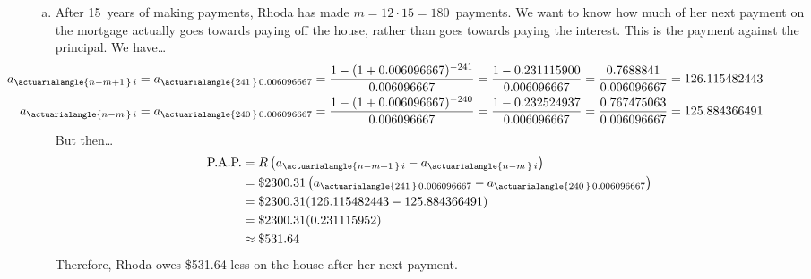 \documentclass[12pt,letterpaper]{exam}
\begin{document}
\begin{questions}
{\begin{enumerate}[(a)]
\item After 15~years of making payments, Rhoda has made $m= 12 \cdot 15= 180$~payments. We want to know how much of her next payment on the mortgage actually goes towards paying off the house, rather than goes towards paying the interest. This is the payment against the principal. We have\dots
	\[
	\begin{aligned}
	\hspace{-2.5cm} a_{\actuarialangle{n - m + 1\,}\, i}&= a_{\actuarialangle{241\,}\, 0.006096667}= \dfrac{1 - (1 + 0.006096667)^{-241}}{0.006096667}= \dfrac{1 - 0.231115900}{0.006096667}= \dfrac{0.7688841}{0.006096667}= 126.115482443 \\
	\hspace{-2.5cm} a_{\actuarialangle{n - m\,}\, i}&= a_{\actuarialangle{240\,}\, 0.006096667}= \dfrac{1 - (1 + 0.006096667)^{-240}}{0.006096667}= \dfrac{1 - 0.232524937}{0.006096667}= \dfrac{0.767475063}{0.006096667}= 125.884366491
	\end{aligned}
	\]
But then\dots
	\[
	\begin{aligned}
	\text{P.A.P.}&= R \left( a_{\actuarialangle{n-m+1\,}\, i} - a_{\actuarialangle{n-m\,}\, i} \right) \\
	&= \$2300.31 \left( a_{\actuarialangle{241\,}\, 0.006096667} - a_{\actuarialangle{240\,}\, 0.006096667} \right) \\
	&= \$2300.31 (126.115482443 - 125.884366491) \\
	&= \$2300.31(0.231115952) \\
	&\approx \$531.64
	\end{aligned}
	\]
Therefore, Rhoda owes \$531.64 less on the house after her next payment. 
\end{enumerate}
}















\end{questions}
\end{document}
